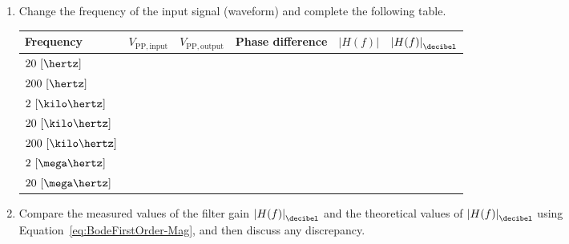 \begin{enumerate}
\item Change the frequency of the input signal (waveform) and complete the following table. %
%
    \begin{center}
    \begin{tabular}{l|c|c|c|c|c}
      \toprule
      Frequency &  $V_{\mathrm{PP,input}}$ & $V_{\mathrm{PP,output}}$ & Phase difference & $\left |H(f) \right |$ & $\left |H(f) \right |_{\decibel}$\\
      \toprule
      $20~[\hertz]$ & ~ & ~ & ~ & ~ & ~\\
      $200~[\hertz]$ & ~ & ~ & ~ & ~ & ~\\
      $2~[\kilo\hertz]$ & ~ & ~ & ~ & ~ & ~\\
      $20~[\kilo\hertz]$ & ~ & ~ & ~ & ~ & ~\\
      $200~[\kilo\hertz]$ & ~ & ~ & ~ & ~ & ~\\
      $2~[\mega\hertz]$ & ~ & ~ & ~ & ~ & ~\\
      $20~[\mega\hertz]$ & ~ & ~ & ~ & ~ & ~\\      
      \bottomrule
    \end{tabular}    
  \end{center}
%  
\item Compare the measured values of the filter gain $\left|H(f)\right |_{\decibel}$ and the theoretical values of $\left|H(f)\right |_{\decibel}$ using Equation~\eqref{eq:BodeFirstOrder-Mag}, and then discuss any discrepancy.   

 \end{enumerate}
 


